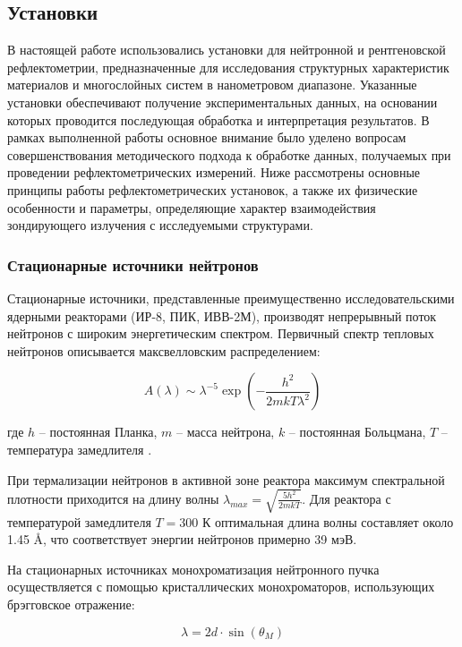 \documentclass[a4paper]{article}
\begin{document}
\subsection{Установки}

В настоящей работе использовались установки для нейтронной и рентгеновской рефлектометрии, предназначенные для исследования структурных характеристик материалов и многослойных систем в нанометровом диапазоне. Указанные установки обеспечивают получение экспериментальных данных, на основании которых проводится последующая обработка и интерпретация результатов. В рамках выполненной работы основное внимание было уделено вопросам совершенствования методического подхода к обработке данных, получаемых при проведении рефлектометрических измерений. Ниже рассмотрены основные принципы работы рефлектометрических установок, а также их физические особенности и параметры, определяющие характер взаимодействия зондирующего излучения с исследуемыми структурами.

\subsubsection{Стационарные источники нейтронов}
Стационарные источники, представленные преимущественно исследовательскими ядерными реакторами (ИР-8, ПИК, ИВВ-2М), производят непрерывный поток нейтронов с широким энергетическим спектром. Первичный спектр тепловых нейтронов описывается максвелловским распределением:

\begin{equation}
A(\lambda) \sim \lambda^{-5} \exp\left(-\frac{h^2}{2mk T\lambda^2}\right)
\end{equation}

где $h$ -- постоянная Планка, $m$ -- масса нейтрона, $k$ -- постоянная Больцмана, $T$ -- температура замедлителя \cite{15}.

При термализации нейтронов в активной зоне реактора максимум спектральной плотности приходится на длину волны $\lambda_{max} = \sqrt{\frac{5h^2}{2mkT}}$. Для реактора с температурой замедлителя $T = 300$ К оптимальная длина волны составляет около 1.45 \AA, что соответствует энергии нейтронов примерно 39 мэВ.

На стационарных источниках монохроматизация нейтронного пучка осуществляется с помощью кристаллических монохроматоров, использующих брэгговское отражение:

\begin{equation}
\lambda = 2d \cdot \sin(\theta_M)
\end{equation}
\end{document}
